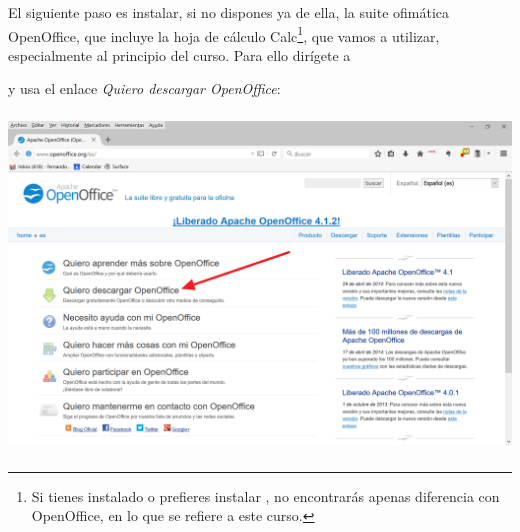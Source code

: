 \documentclass[10pt,a4paper]{article}\usepackage[]{graphicx}\usepackage[]{color}
\newcounter {cont01}
\begin{document}
El siguiente paso es instalar, si no dispones ya de ella, la suite ofimática OpenOffice, que
incluye la hoja de cálculo Calc\footnote{Si tienes instalado o prefieres instalar
, no encontrarás apenas diferencia con OpenOffice, en
lo que se refiere a este curso.}, que vamos a utilizar, especialmente al principio del curso. Para
ello dirígete a
\begin{center}
\end{center}
y usa el enlace {\em Quiero descargar  OpenOffice}:
    \begin{center}
    \includegraphics[height=9cm]{../fig/Tut00-WebOpenOffice-01-201605.png}
    \end{center}
\end{document}
